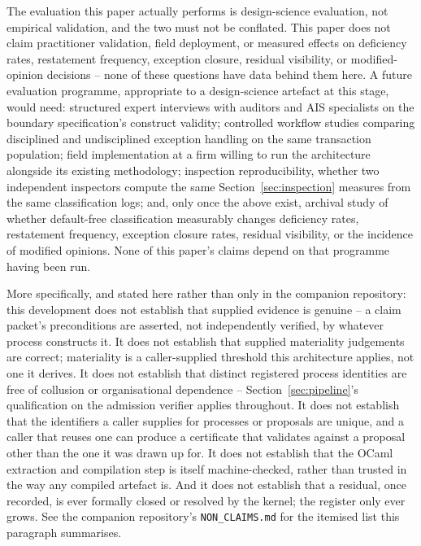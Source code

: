 \documentclass[11pt,a4paper]{article}
\theoremstyle{definition}
\theoremstyle{remark}
\begin{document}
The evaluation this paper actually performs is design-science evaluation, not empirical validation, and the two must not be conflated. This paper does not claim practitioner validation, field deployment, or measured effects on deficiency rates, restatement frequency, exception closure, residual visibility, or modified-opinion decisions -- none of these questions have data behind them here. A future evaluation programme, appropriate to a design-science artefact at this stage, would need: structured expert interviews with auditors and AIS specialists on the boundary specification's construct validity; controlled workflow studies comparing disciplined and undisciplined exception handling on the same transaction population; field implementation at a firm willing to run the architecture alongside its existing methodology; inspection reproducibility, whether two independent inspectors compute the same Section~\ref{sec:inspection} measures from the same classification logs; and, only once the above exist, archival study of whether default-free classification measurably changes deficiency rates, restatement frequency, exception closure rates, residual visibility, or the incidence of modified opinions. None of this paper's claims depend on that programme having been run.

More specifically, and stated here rather than only in the companion repository: this development does not establish that supplied evidence is genuine -- a claim packet's preconditions are asserted, not independently verified, by whatever process constructs it. It does not establish that supplied materiality judgements are correct; materiality is a caller-supplied threshold this architecture applies, not one it derives. It does not establish that distinct registered process identities are free of collusion or organisational dependence -- Section~\ref{sec:pipeline}'s qualification on the admission verifier applies throughout. It does not establish that the identifiers a caller supplies for processes or proposals are unique, and a caller that reuses one can produce a certificate that validates against a proposal other than the one it was drawn up for. It does not establish that the OCaml extraction and compilation step is itself machine-checked, rather than trusted in the way any compiled artefact is. And it does not establish that a residual, once recorded, is ever formally closed or resolved by the kernel; the register only ever grows. See the companion repository's \texttt{NON\_CLAIMS.md} for the itemised list this paragraph summarises.
\end{document}

